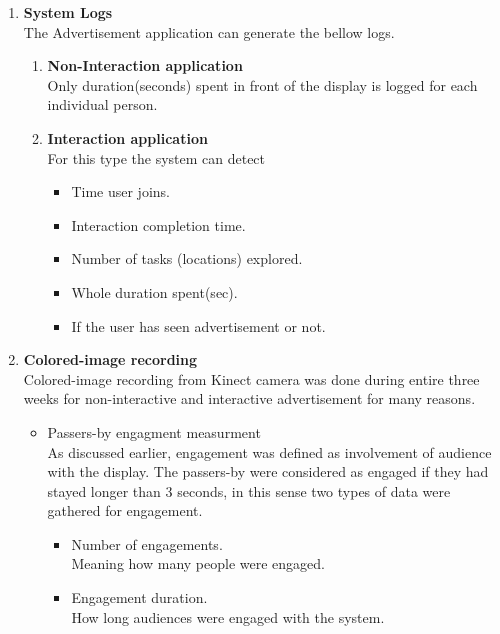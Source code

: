 \begin{enumerate}
\begin{enumerate}
\end{enumerate}


\item \textbf{System Logs} \\
The Advertisement application can generate the bellow logs.
\begin{enumerate}
\item	\textbf{Non-Interaction application} \\
Only duration(seconds) spent in front of the display is logged for each individual person.

\item	\textbf{Interaction application}\\
For this type the system can detect

\begin{itemize}
\item	Time user joins.
\item	Interaction completion time.
\item	Number of tasks (locations) explored.
\item	Whole duration spent(sec).
\item	If the user has seen advertisement or not.
\end{itemize}

\end{enumerate}

\item \textbf{Colored-image recording} \\
Colored-image recording from Kinect camera was done during entire three weeks for non-interactive and interactive advertisement for many reasons.

\begin{itemize}

\item Passers-by engagment measurment \\
As discussed earlier, engagement was defined as involvement of audience with the display. The passers-by were considered as engaged if they had stayed longer than 3 seconds, in this sense two types of data were gathered for engagement.

        \begin{itemize}
        \item Number of engagements. \\
        Meaning how many people were engaged.

        \item Engagement duration. \\
        How long audiences were engaged with the system.


\end{itemize}
\end{itemize}
\end{enumerate}
